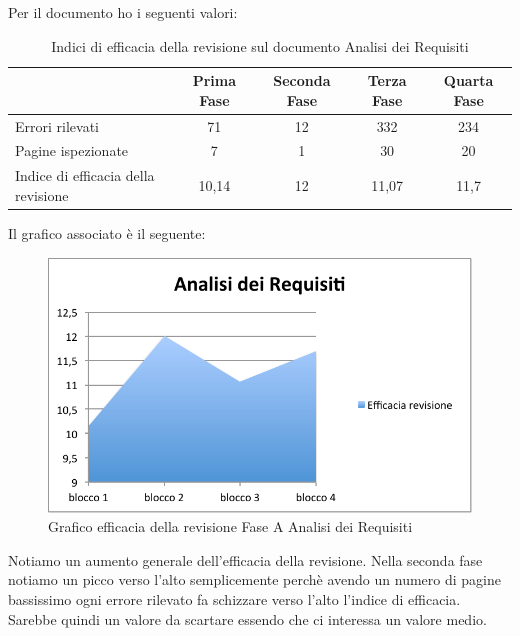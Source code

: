 						Per il documento  ho i seguenti valori:	
						\begin{table}[H]\centering
							\begin{tabu}{| l | c | c | c | c |}
								\hline
													&Prima Fase 	& Seconda Fase	& Terza Fase	& Quarta Fase  \\ \hline
												
								Errori rilevati				& 71		& 12 		& 332			& 234 	 \\ \hline
								Pagine ispezionate			& 7		& 1 		& 30			& 20 	 \\ \hline\hline
							
								Indice di efficacia della revisione 	 & 10,14		& 12 		& 11,07			& 11,7 	 \\ \hline
							\end{tabu}
							\caption{Indici di efficacia della revisione sul documento Analisi dei Requisiti}
						\end{table}
						Il grafico associato è il seguente:
						\begin{figure}[H]\centering
							\includegraphics[width=12cm]{PianoDiQualifica/Pics/EfficaciaAdRFaseA.pdf}
							\caption{Grafico efficacia della revisione Fase A Analisi dei Requisiti}
						\end{figure}
						Notiamo un aumento generale dell'efficacia della revisione. Nella seconda fase notiamo un picco verso l'alto semplicemente perchè avendo un numero di pagine bassissimo ogni errore rilevato fa schizzare verso l'alto l'indice di efficacia. Sarebbe quindi un valore da scartare essendo che ci interessa un valore medio.\\
					
